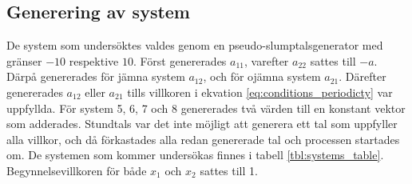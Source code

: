 \subsection{Generering av system}
De system som undersöktes valdes genom en pseudo-slumptalsgenerator med gränser \(-10\) respektive \(10\). Först genererades \(a_{11}\), varefter \(a_{22}\) sattes till \(-a\). Därpå genererades för jämna system \(a_{12}\), och för ojämna system \(a_{21}\). Därefter genererades \(a_{12}\) eller \(a_{21}\) tills villkoren i ekvation \ref{eq:conditions_periodicty} var uppfyllda. För system 5, 6, 7 och 8 genererades två värden till en konstant vektor som adderades. Stundtals var det inte möjligt att generera ett tal som uppfyller alla villkor, och då förkastades alla redan genererade tal och processen startades om. De systemen som kommer undersökas finnes i tabell \ref{tbl:systems_table}. Begynnelsevillkoren för både \(x_1\) och \(x_2\) sattes till 1.

